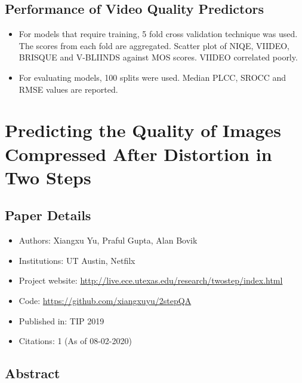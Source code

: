 \documentclass{article}
\begin{document}
    \subsection{Performance of Video Quality Predictors}\label{subsec:Large_Scale_Study_of_Perceptual_Video_Quality_(LIVE_VQC_Database):performance-vqa}
    \begin{itemize}
        \item For models that require training, 5 fold cross validation technique was used.
        The scores from each fold are aggregated.
        Scatter plot of NIQE, VIIDEO, BRISQUE and V-BLIINDS against MOS scores.
        VIIDEO correlated poorly.
        \item For evaluating models, 100 splits were used.
        Median PLCC, SROCC and RMSE values are reported.
    \end{itemize}
    \newpage


    \section{Predicting the Quality of Images Compressed After Distortion in Two Steps}\label{sec:Predicting_the_Quality_of_Images_Compressed_After_Distortion_in_Two_Steps}
    \subsection*{Paper Details}
    \begin{itemize}
        \item Authors: Xiangxu Yu, Praful Gupta, Alan Bovik
        \item Institutions: UT Austin, Netfilx
        \item Project website: \url{http://live.ece.utexas.edu/research/twostep/index.html}
        \item Code: \url{https://github.com/xiangxuyu/2stepQA}
        \item Published in: TIP 2019
        \item Citations: 1 (As of 08-02-2020)
    \end{itemize}

    \subsection*{Abstract}
\end{document}
